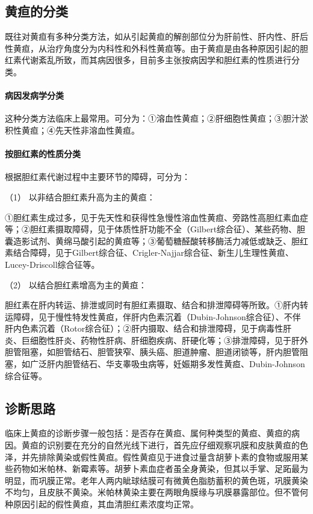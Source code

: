 \subsection{黄疸的分类}

既往对黄疸有多种分类方法，如从引起黄疸的解剖部位分为肝前性、肝内性、肝后性黄疸，从治疗角度分为内科性和外科性黄疸等。由于黄疸是由各种原因引起的胆红素代谢紊乱所致，而其病因很多，目前多主张按病因学和胆红素的性质进行分类。

\paragraph{病因发病学分类}

这种分类方法临床上最常用。可分为：①溶血性黄疸；②肝细胞性黄疸；③胆汁淤积性黄疸；④先天性非溶血性黄疸。

\paragraph{按胆红素的性质分类}

根据胆红素代谢过程中主要环节的障碍，可分为：

\hypertarget{text00039.htmlux5cux23CHP1-16-2-2-1}{}
（1） 以非结合胆红素升高为主的黄疸：

①胆红素生成过多，见于先天性和获得性急慢性溶血性黄疸、旁路性高胆红素血症等；②胆红素摄取障碍，见于体质性肝功能不全（Gilbert综合征）、某些药物、胆囊造影试剂、黄绵马酸引起的黄疸等；③葡萄糖醛酸转移酶活力减低或缺乏、胆红素结合障碍，见于Gilbert综合征、Crigler-Najjar综合征、新生儿生理性黄疸、Lucey-Driscoll综合征等。

\hypertarget{text00039.htmlux5cux23CHP1-16-2-2-2}{}
（2） 以结合胆红素增高为主的黄疸：

胆红素在肝内转运、排泄或同时有胆红素摄取、结合和排泄障碍等所致。①肝内转运障碍，见于慢性特发性黄疸，伴肝内色素沉着（Dubin-Johnson综合征）、不伴肝内色素沉着（Rotor综合征）；②肝内摄取、结合和排泄障碍，见于病毒性肝炎、巨细胞性肝炎、药物性肝病、肝细胞疾病、肝硬化等；③排泄障碍，见于肝外胆管阻塞，如胆管结石、胆管狭窄、胰头癌、胆道肿瘤、胆道闭锁等，肝内胆管阻塞，如广泛肝内胆管结石、华支睾吸虫病等，妊娠期多发性黄疸、Dubin-Johnson综合征等。

\subsection{诊断思路}

临床上黄疸的诊断步骤一般包括：是否存在黄疸、属何种类型的黄疸、黄疸的病因。黄疸的识别要在充分的自然光线下进行，首先应仔细观察巩膜和皮肤黄疸的色泽，并先排除黄染或假性黄疸。假性黄疸见于进食过量含胡萝卜素的食物或服用某些药物如米帕林、新霉素等。胡萝卜素血症者虽全身黄染，但其以手掌、足跖最为明显，而巩膜正常。老年人两内眦球结膜可有微黄色脂肪蓄积的黄色斑，巩膜黄染不均匀，且皮肤不黄染。米帕林黄染主要在两眼角膜缘与巩膜暴露部位。但不管何种原因引起的假性黄疸，其血清胆红素浓度均正常。


